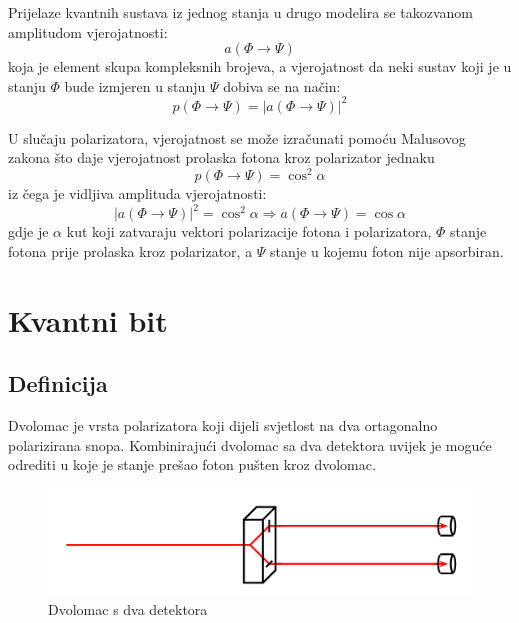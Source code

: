Prijelaze kvantnih sustava iz jednog stanja u drugo modelira se takozvanom amplitudom vjerojatnosti:
\begin{equation}
a(\Phi \rightarrow \Psi)
\end{equation}
koja je element skupa kompleksnih brojeva, a vjerojatnost da neki sustav koji je u stanju $\Phi$ bude izmjeren u stanju $\Psi$ dobiva se na način:
\begin{equation}
p(\Phi \rightarrow \Psi) = |a(\Phi \rightarrow \Psi)|^2
\end{equation}

U slučaju polarizatora, vjerojatnost se može izračunati pomoću Malusovog zakona što daje vjerojatnost prolaska fotona kroz polarizator jednaku
\begin{equation}
p(\Phi \rightarrow \Psi) = \cos^2 \alpha
\end{equation}
iz čega je vidljiva amplituda vjerojatnosti:
\begin{equation}
|a(\Phi \rightarrow \Psi)|^2 = \cos^2 \alpha \Rightarrow a(\Phi \rightarrow \Psi) = \cos \alpha
\end{equation}
gdje je $\alpha$ kut koji zatvaraju vektori polarizacije fotona i polarizatora, $\Phi$ stanje fotona prije prolaska kroz polarizator, a $\Psi$ stanje u kojemu foton nije apsorbiran.



\section{Kvantni bit}

\subsection{Definicija}
Dvolomac je vrsta polarizatora koji dijeli svjetlost na dva ortagonalno polarizirana snopa. Kombinirajući dvolomac sa dva detektora uvijek je moguće odrediti u koje je stanje prešao foton pušten kroz dvolomac.
\begin{figure}[H]
\centering
\includegraphics[scale=0.5]{img/dvolomac_detektor.png}
\caption{Dvolomac s dva detektora} 
\end{figure}

